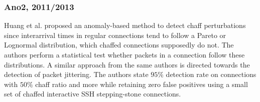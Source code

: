 \documentclass[runningheads,11pt]{llncs}\usepackage[]{graphicx}\usepackage[]{color}
\begin{document}
\subsubsection{Ano2, 2011/2013}
Huang et al. \cite{huang2011detecting} proposed an anomaly-based method to detect chaff perturbations since interarrival times in regular connections tend to follow a Pareto or Lognormal distribution, which chaffed connections supposedly do not. The authors perform a statistical test whether packets in a connection follow these distributions.%
A similar approach from the same authors \cite{ding2013detecting} is directed towards the detection of packet jittering.
The authors state $95\%$ detection rate on connections with $50\%$ chaff ratio and more while retaining zero false positives using a small set of chaffed interactive SSH stepping-stone connections.




\end{document}
